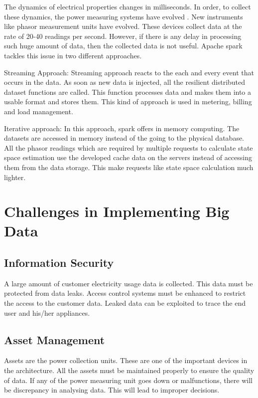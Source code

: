 \documentclass[sigconf]{acmart}
\begin{document}
The dynamics of electrical properties changes in milliseconds. In order, to collect these dynamics, the power measuring systems  have evolved . New instruments like phasor measurement units have evolved. These devices collect data at the rate of 20-40 readings per second. However, if there is any delay in processing such huge amount of data, then the collected data is not useful. Apache spark tackles this issue in two different approaches.

Streaming Approach:\cite{Zaharia} Streaming approach reacts to the each and every event that occurs in the data. As soon as new data is injected, all the resilient distributed dataset functions are called. This function processes data and makes them into a usable format and stores them. This kind of approach is used in metering, billing and load management. 

Iterative approach:\cite{2013} In this approach, spark offers in memory computing. The datasets are accessed in memory instead of the going to the physical database. All the phasor readings which are required by multiple requests to calculate state space estimation use the developed cache data on the servers instead of accessing them from the data storage. This make requests like state space calculation much lighter.

\section{Challenges in Implementing Big Data}
\subsection{Information Security}
A large amount of customer electricity usage data is collected. This data must be protected from data leaks. Access control systems must be enhanced to restrict the access to the customer data. Leaked data can be exploited to trace the end user and his/her appliances.\cite{Yu}  

\subsection{Asset Management}
Assets are the power collection units. These are one of the important devices in the architecture. All the assets must be maintained properly to ensure the quality of data. If any of the power measuring unit goes down or malfunctions, there will be discrepancy in analysing data. This will lead to improper decisions.
\end{document}
